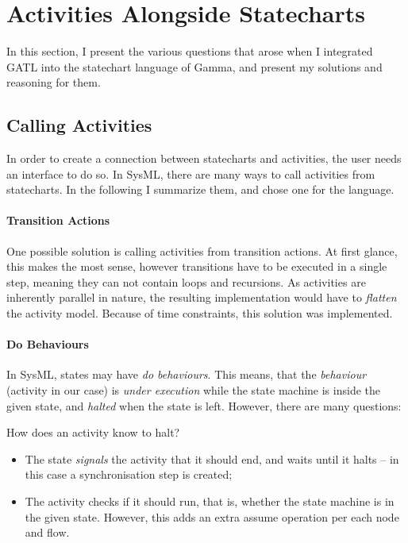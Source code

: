 \section{Activities Alongside Statecharts}\label{sec:activities-alongside-statecharts}

In this section, I present the various questions that arose when I integrated GATL into the statechart language of Gamma, and present my solutions and reasoning for them.

\subsection{Calling Activities}\label{ssec:calling-activities}

In order to create a connection between statecharts and activities, the user needs an interface to do so. In SysML, there are many ways to call activities from statecharts. In the following I summarize them, and chose one for the language.

\paragraph{Transition Actions}

One possible solution is calling activities from transition actions. At first glance, this makes the most sense, however transitions have to be executed in a single step, meaning they can not contain loops and recursions. As activities are inherently parallel in nature, the resulting implementation would have to \emph{flatten} the activity model. Because of time constraints, this solution was implemented. 

\paragraph{Do Behaviours}

In SysML, states may have \emph{do behaviours}. This means, that the \emph{behaviour} (activity in our case) is \emph{under execution} while the state machine is inside the given state, and \emph{halted} when the state is left. However, there are many questions:

How does an activity know to halt?

\begin{itemize}
	\item The state \emph{signals} the activity that it should end, and waits until it halts -- in this case a synchronisation step is created;
	\item The activity checks if it should run, that is, whether the state machine is in the given state. However, this adds an extra assume operation per each node and flow.
\end{itemize}

